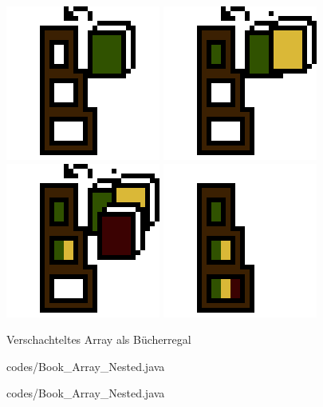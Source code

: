 \documentclass{../tuda-beamer}
\begin{document}
  \begin{frame}[c]
    \begin{figure}[h]
      \centering
      \includegraphics[width=.2\linewidth]{graphics/lib_2_1.png}
      \includegraphics[width=.2\linewidth]{graphics/lib_2_2.png}
      \includegraphics[width=.2\linewidth]{graphics/lib_2_3.png}
      \includegraphics[width=.2\linewidth]{graphics/lib_2_4.png}
      \caption{Verschachteltes Array als Bücherregal}
    \end{figure}
  \end{frame}

  \begin{frame}[c]
    \begin{figure}[h]
      \centering
      
      {codes/Book_Array_Nested.java}
    \end{figure}
  \end{frame}

  \begin{frame}[c]
    \begin{figure}[h]
      \centering
      
      {codes/Book_Array_Nested.java}
    \end{figure}
  \end{frame}
\end{document}
